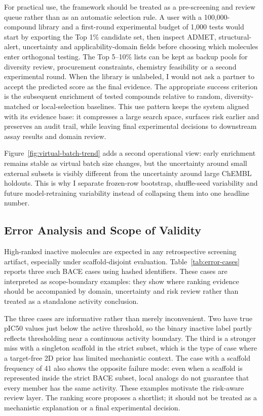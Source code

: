 \documentclass[manuscript=article]{achemso}
\begin{document}
For practical use, the framework should be treated as a pre-screening and
review queue rather than as an automatic selection rule. A user with a
100,000-compound library and a first-round experimental budget of 1,000 tests
would start by exporting the Top 1\% candidate set, then inspect ADMET,
structural-alert, uncertainty and applicability-domain fields before choosing
which molecules enter orthogonal testing. The Top 5--10\% lists can be kept as
backup pools for diversity review, procurement constraints, chemistry
feasibility or a second experimental round. When the library is unlabeled, I
would not ask a partner to accept the predicted score as the final evidence.
The appropriate success criterion is the subsequent enrichment of tested
compounds relative to random, diversity-matched or local-selection baselines.
This use pattern keeps the system aligned with its evidence base: it compresses
a large search space, surfaces risk earlier and preserves an audit trail, while
leaving final experimental decisions to downstream assay results and domain
review.

Figure~\ref{fig:virtual-batch-trend} adds a second operational view: early
enrichment remains stable as virtual batch size changes, but the uncertainty
around small external subsets is visibly different from the uncertainty around
large ChEMBL holdouts. This is why I separate frozen-row bootstrap,
shuffle-seed variability and future model-retraining variability instead of
collapsing them into one headline number.

\subsection{Error Analysis and Scope of Validity}
High-ranked inactive molecules are expected in any retrospective screening
artifact, especially under scaffold-disjoint evaluation. Table~\ref{tab:error-cases}
reports three such BACE cases using hashed identifiers. These cases are
interpreted as scope-boundary examples: they show where ranking evidence should
be accompanied by domain, uncertainty and risk review rather than treated as a
standalone activity conclusion.
\ErrorCasesTable

The three cases are informative rather than merely inconvenient. Two have true
pIC50 values just below the active threshold, so the binary inactive label
partly reflects thresholding near a continuous activity boundary. The third is
a stronger miss with a singleton scaffold in the strict subset, which is the
type of case where a target-free 2D prior has limited mechanistic context. The
case with a scaffold frequency of 41 also shows the opposite failure mode:
even when a scaffold is represented inside the strict BACE subset, local
analogs do not guarantee that every member has the same activity. These
examples motivate the risk-aware review layer. The ranking score proposes a
shortlist; it should not be treated as a mechanistic explanation or a final
experimental decision.
\end{document}
